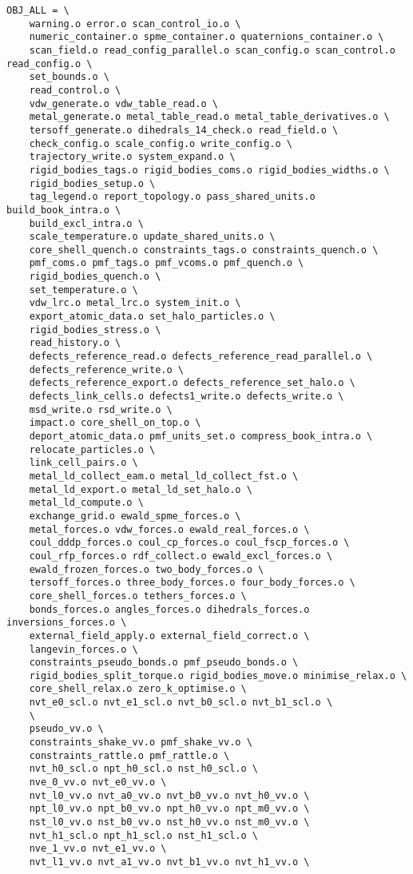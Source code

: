 \begin{verbatim}
OBJ_ALL = \
	warning.o error.o scan_control_io.o \
	numeric_container.o spme_container.o quaternions_container.o \
	scan_field.o read_config_parallel.o scan_config.o scan_control.o read_config.o \
	set_bounds.o \
	read_control.o \
	vdw_generate.o vdw_table_read.o \
	metal_generate.o metal_table_read.o metal_table_derivatives.o \
	tersoff_generate.o dihedrals_14_check.o read_field.o \
	check_config.o scale_config.o write_config.o \
	trajectory_write.o system_expand.o \
	rigid_bodies_tags.o rigid_bodies_coms.o rigid_bodies_widths.o \
	rigid_bodies_setup.o \
	tag_legend.o report_topology.o pass_shared_units.o build_book_intra.o \
	build_excl_intra.o \
	scale_temperature.o update_shared_units.o \
	core_shell_quench.o constraints_tags.o constraints_quench.o \
	pmf_coms.o pmf_tags.o pmf_vcoms.o pmf_quench.o \
	rigid_bodies_quench.o \
	set_temperature.o \
	vdw_lrc.o metal_lrc.o system_init.o \
	export_atomic_data.o set_halo_particles.o \
	rigid_bodies_stress.o \
	read_history.o \
	defects_reference_read.o defects_reference_read_parallel.o \
	defects_reference_write.o \
	defects_reference_export.o defects_reference_set_halo.o \
	defects_link_cells.o defects1_write.o defects_write.o \
	msd_write.o rsd_write.o \
	impact.o core_shell_on_top.o \
	deport_atomic_data.o pmf_units_set.o compress_book_intra.o \
	relocate_particles.o \
	link_cell_pairs.o \
	metal_ld_collect_eam.o metal_ld_collect_fst.o \
	metal_ld_export.o metal_ld_set_halo.o \
	metal_ld_compute.o \
	exchange_grid.o ewald_spme_forces.o \
	metal_forces.o vdw_forces.o ewald_real_forces.o \
	coul_dddp_forces.o coul_cp_forces.o coul_fscp_forces.o \
	coul_rfp_forces.o rdf_collect.o ewald_excl_forces.o \
	ewald_frozen_forces.o two_body_forces.o \
	tersoff_forces.o three_body_forces.o four_body_forces.o \
	core_shell_forces.o tethers_forces.o \
	bonds_forces.o angles_forces.o dihedrals_forces.o inversions_forces.o \
	external_field_apply.o external_field_correct.o \
	langevin_forces.o \
	constraints_pseudo_bonds.o pmf_pseudo_bonds.o \
	rigid_bodies_split_torque.o rigid_bodies_move.o minimise_relax.o \
	core_shell_relax.o zero_k_optimise.o \
	nvt_e0_scl.o nvt_e1_scl.o nvt_b0_scl.o nvt_b1_scl.o \
	\
	pseudo_vv.o \
	constraints_shake_vv.o pmf_shake_vv.o \
	constraints_rattle.o pmf_rattle.o \
	nvt_h0_scl.o npt_h0_scl.o nst_h0_scl.o \
	nve_0_vv.o nvt_e0_vv.o \
	nvt_l0_vv.o nvt_a0_vv.o nvt_b0_vv.o nvt_h0_vv.o \
	npt_l0_vv.o npt_b0_vv.o npt_h0_vv.o npt_m0_vv.o \
	nst_l0_vv.o nst_b0_vv.o nst_h0_vv.o nst_m0_vv.o \
	nvt_h1_scl.o npt_h1_scl.o nst_h1_scl.o \
	nve_1_vv.o nvt_e1_vv.o \
	nvt_l1_vv.o nvt_a1_vv.o nvt_b1_vv.o nvt_h1_vv.o \

\end{verbatim}
